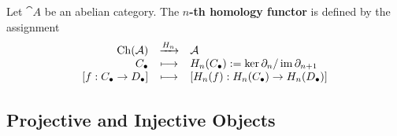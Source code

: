 	\begin{lemma}

	\end{lemma}

	\begin{lemma}
	\end{lemma}

	\begin{definition}
		Let $\cat{A}$ be an abelian category. The \textbf{$n$-th homology functor} is defined by the assignment
		\begin{equation*}
			\begin{array}{rcl}
				\operatorname{Ch}(\mathcal{A}) & \xrightarrow{H_n} & \mathcal{A}\\
				C_\bullet & \longmapsto & H_n(C_\bullet) := \ker \partial_n / \operatorname{im} \partial_{n+1}\\
				{[f:C_\bullet \rightarrow D_\bullet]} & \longmapsto & {[H_n(f):H_n(C_\bullet) \rightarrow H_n(D_\bullet)]}
			\end{array}
		\end{equation*}
	\end{definition}

	\newpage
	\subsection{Projective and Injective Objects}

